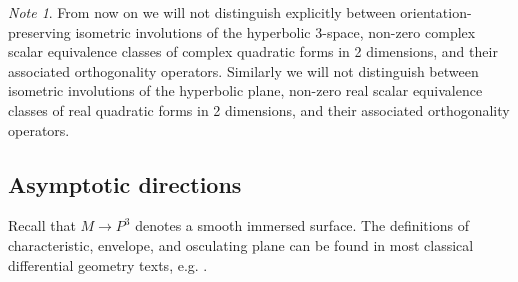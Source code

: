 \documentclass[11pt]{article}
\numberwithin{equation}{section}
\newcounter{count}
\theoremstyle{plain}
\theoremstyle{remark}
\newtheorem{note}[count]{Note}
\newcommand{\R}{\mathbb{R}}
\begin{document}

\begin{note}From now on we will not distinguish explicitly between orientation-preserving isometric involutions of the hyperbolic 3-space, non-zero complex scalar equivalence classes of complex quadratic forms in 2 dimensions, and their associated orthogonality operators. Similarly we will not distinguish between isometric involutions of the hyperbolic plane, non-zero real scalar equivalence classes of real quadratic forms in 2 dimensions, and their associated orthogonality operators.
\end{note}





\subsection{Asymptotic directions}\label{asympdir}


Recall that $M\rightarrow P^{3}$ denotes a smooth immersed surface. The definitions of characteristic, envelope, and osculating plane can be found in most classical differential geometry texts, e.g. \cite{eisenhardt}.
\end{document}
